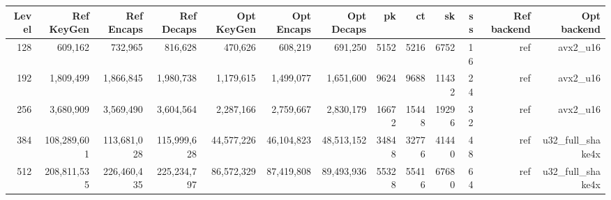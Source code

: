 \begin{tabular}{rrrrrrrrrrrrr}
\toprule
Level & Ref KeyGen & Ref Encaps & Ref Decaps & Opt KeyGen & Opt Encaps & Opt Decaps & pk & ct & sk & ss & Ref backend & Opt backend \\
\midrule
128 & 609,162 & 732,965 & 816,628 & 470,626 & 608,219 & 691,250 & 5152 & 5216 & 6752 & 16 & ref & avx2_u16 \\
192 & 1,809,499 & 1,866,845 & 1,980,738 & 1,179,615 & 1,499,077 & 1,651,600 & 9624 & 9688 & 11432 & 24 & ref & avx2_u16 \\
256 & 3,680,909 & 3,569,490 & 3,604,564 & 2,287,166 & 2,759,667 & 2,830,179 & 16672 & 15448 & 19296 & 32 & ref & avx2_u16 \\
384 & 108,289,601 & 113,681,028 & 115,999,628 & 44,577,226 & 46,104,823 & 48,513,152 & 34848 & 32776 & 41440 & 48 & ref & u32_full_shake4x \\
512 & 208,811,535 & 226,460,435 & 225,234,797 & 86,572,329 & 87,419,808 & 89,493,936 & 55328 & 55416 & 67680 & 64 & ref & u32_full_shake4x \\
\bottomrule
\end{tabular}
